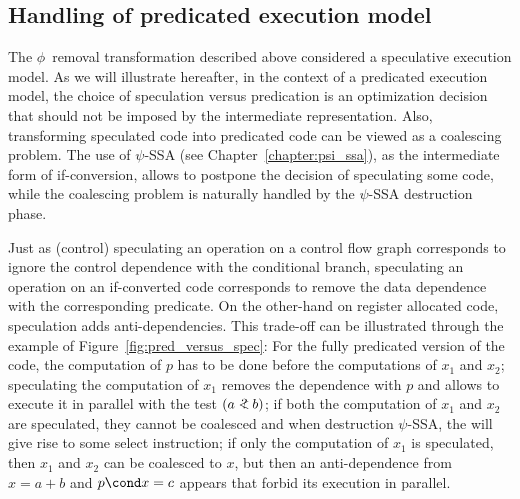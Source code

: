 \subsection{Handling of predicated execution model}

The $\phi$~removal transformation described above considered a speculative execution model. As we will illustrate hereafter, in the context of a predicated execution model, the choice of speculation versus predication is an optimization decision that should not be imposed by the intermediate representation. Also, transforming speculated code into predicated code can be viewed as a coalescing problem. The use of $\psi$-SSA (see Chapter~\ref{chapter:psi_ssa}), as the intermediate form of if-conversion, allows to postpone the decision of speculating some code, while the coalescing problem is naturally handled by the $\psi$-SSA destruction phase. 

Just as (control) speculating an operation on a control flow graph corresponds to ignore the control dependence with the conditional branch, speculating an operation on an if-converted code corresponds to remove the data dependence with the corresponding predicate. On the other-hand on register allocated code, speculation adds anti-dependencies. This trade-off can be illustrated through the example of Figure~\ref{fig:pred_versus_spec}: For the fully predicated version of the code, the computation of $p$ has to be done before the computations of $x_1$ and $x_2$; speculating the computation of $x_1$ removes the dependence with $p$ and allows to execute it in parallel with the test $(a<\hspace{-.6em}?\ b)$; if both the computation of $x_1$ and $x_2$ are speculated, they cannot be coalesced and when destruction $\psi$-SSA, the \psifun\index{\psifun} will give rise to some select instruction; if only the computation of $x_1$ is speculated, then $x_1$ and $x_2$ can be coalesced to $x$, but then an anti-dependence from $x=a+b$ and $p\cond x = c $ appears that forbid its  execution in parallel.

